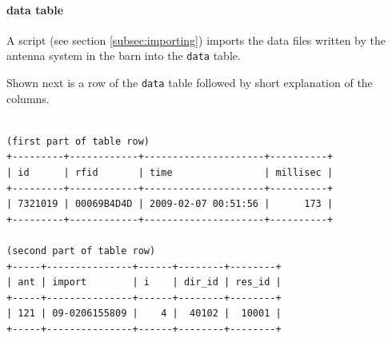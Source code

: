 \paragraph{data table}
\label{para:data_table}

A script (see section \ref{subsec:importing}) imports the data files written by the antenna system in the barn into the \lstinline|data| table.

Shown next is a row of the \lstinline|data| table followed by short explanation of the columns.

\codescript
{}
\begin{lstlisting}[frame=none]

(first part of table row)
+---------+------------+---------------------+----------+
| id      | rfid       | time                | millisec |
+---------+------------+---------------------+----------+
| 7321019 | 00069B4D4D | 2009-02-07 00:51:56 |      173 |
+---------+------------+---------------------+----------+

(second part of table row)
+-----+---------------+------+--------+--------+
| ant | import        | i    | dir_id | res_id |
+-----+---------------+------+--------+--------+
| 121 | 09-0206155809 |    4 |  40102 |  10001 |
+-----+---------------+------+--------+--------+

\end{lstlisting}


